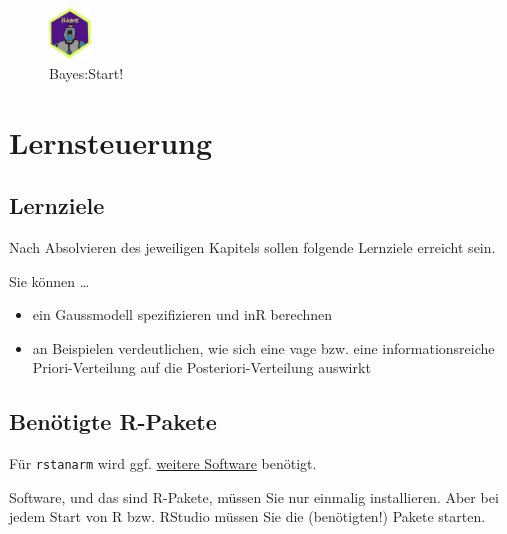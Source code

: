 \documentclass[
  a4paper,
  DIV=11]{scrreprt}
\providecommand{\tightlist}{%
  \setlength{\itemsep}{0pt}\setlength{\parskip}{0pt}}\usepackage{longtable,booktabs,array}
\theoremstyle{definition}
\theoremstyle{remark}
\begin{document}
\begin{figure}

{\centering \includegraphics[width=0.1\textwidth,height=\textheight]{./img/Golem_hex.png}

}

\caption{Bayes:Start!}

\end{figure}

\hypertarget{lernsteuerung-6}{%
\section{Lernsteuerung}\label{lernsteuerung-6}}

\hypertarget{lernziele-7}{%
\subsection{Lernziele}\label{lernziele-7}}

Nach Absolvieren des jeweiligen Kapitels sollen folgende Lernziele
erreicht sein.

Sie können \ldots{}

\begin{itemize}
\tightlist
\item
  ein Gaussmodell spezifizieren und inR berechnen
\item
  an Beispielen verdeutlichen, wie sich eine vage bzw. eine
  informationsreiche Priori-Verteilung auf die Posteriori-Verteilung
  auswirkt
\end{itemize}

\hypertarget{benuxf6tigte-r-pakete-4}{%
\subsection{Benötigte R-Pakete}\label{benuxf6tigte-r-pakete-4}}

Für \texttt{rstanarm} wird ggf.
\href{https://github.com/stan-dev/rstan/wiki/RStan-Getting-Started}{weitere
Software} benötigt.

\begin{tcolorbox}[enhanced jigsaw, left=2mm, colframe=quarto-callout-note-color-frame, opacityback=0, arc=.35mm, rightrule=.15mm, breakable, toptitle=1mm, colbacktitle=quarto-callout-note-color!10!white, colback=white, coltitle=black, bottomrule=.15mm, titlerule=0mm, opacitybacktitle=0.6, bottomtitle=1mm, title=\textcolor{quarto-callout-note-color}{\faInfo}\hspace{0.5em}{Hinweis}, toprule=.15mm, leftrule=.75mm]
Software, und das sind R-Pakete, müssen Sie nur einmalig installieren.
Aber bei jedem Start von R bzw. RStudio müssen Sie die (benötigten!)
Pakete starten.
\end{tcolorbox}
\end{document}
